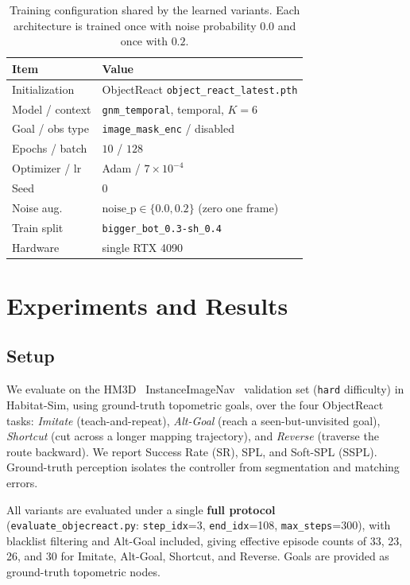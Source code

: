 \documentclass[conference]{IEEEtran}
\begin{document}
\begin{table}[htbp]
\centering
\caption{Training configuration shared by the learned variants. Each architecture is trained once with noise probability $0.0$ and once with $0.2$.}
\label{tab:train}
\small
\setlength{\tabcolsep}{4pt}
\begin{tabular}{ll}
\toprule
Item & Value \\
\midrule
Initialization & ObjectReact \texttt{object\_react\_latest.pth} \\
Model / context & \texttt{gnm\_temporal}, temporal, $K{=}6$ \\
Goal / obs type & \texttt{image\_mask\_enc} / disabled \\
Epochs / batch & $10$ / $128$ \\
Optimizer / lr & Adam / $7\times10^{-4}$ \\
Seed & $0$ \\
Noise aug. & $\mathrm{noise\_p}\in\{0.0,0.2\}$ (zero one frame) \\
Train split & \texttt{bigger\_bot\_0.3-sh\_0.4} \\
Hardware & single RTX 4090 \\
\bottomrule
\end{tabular}
\end{table}


\section{Experiments and Results}

\subsection{Setup}
We evaluate on the HM3D~\cite{ramakrishnan2021hm3d} InstanceImageNav~\cite{krantz2022iin} validation set (\texttt{hard} difficulty) in Habitat-Sim, using ground-truth topometric goals, over the four ObjectReact tasks: \emph{Imitate} (teach-and-repeat), \emph{Alt-Goal} (reach a seen-but-unvisited goal), \emph{Shortcut} (cut across a longer mapping trajectory), and \emph{Reverse} (traverse the route backward). We report Success Rate (SR), SPL, and Soft-SPL (SSPL). Ground-truth perception isolates the controller from segmentation and matching errors.

All variants are evaluated under a single \textbf{full protocol} (\texttt{evaluate\_objecreact.py}: \texttt{step\_idx}=3, \texttt{end\_idx}=108, \texttt{max\_steps}=300), with blacklist filtering and Alt-Goal included, giving effective episode counts of 33, 23, 26, and 30 for Imitate, Alt-Goal, Shortcut, and Reverse. Goals are provided as ground-truth topometric nodes.
\end{document}
